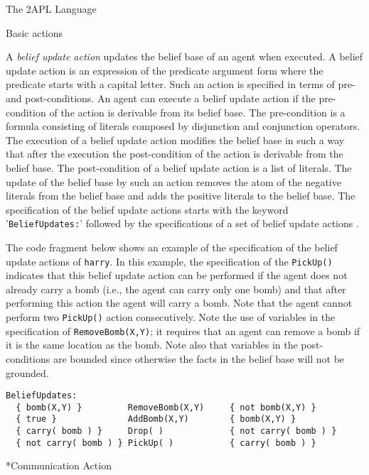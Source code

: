 \begin{chapter}{The 2APL Language}
\begin{section}{Basic actions}
\begin{subsection}
A {\em belief update action} updates the belief base of an agent
when executed. A belief update action  is an
expression of the predicate argument form where the predicate starts
with a capital letter. Such an action is specified in terms of pre-
and post-conditions. An agent can execute a belief update action if
the pre-condition of the action is derivable from its belief base.
The pre-condition is a formula consisting of literals composed by
disjunction and conjunction operators. The execution of a belief
update action modifies the belief base in such a way that after the
execution the post-condition of the action is derivable from the
belief base. The post-condition of a belief update action is a list
of literals. The update of the belief base by such an action removes
the atom of the negative literals from the belief base and adds the
positive literals to the belief base. The specification of the
belief update actions starts with the keyword '{\tt BeliefUpdates:}'
followed by the specifications of a set of belief update actions
.

The code fragment below shows an example of the specification of the
belief update actions of {\tt harry}. In this example, the
specification of the {\tt PickUp()} indicates that this belief
update action can be performed if the agent does not already carry a
bomb (i.e., the agent can carry only one bomb) and that after
performing this action the agent will carry a bomb.  Note that the
agent cannot perform two {\tt PickUp()} action consecutively. Note
the use of variables in the specification of {\tt RemoveBomb(X,Y)};
it requires that an agent can remove a bomb if it is the same
location as the bomb. Note also that variables in the
post-conditions are bounded since otherwise the facts in the belief
base will not be grounded.

\begin{verbatim}
BeliefUpdates:
  { bomb(X,Y) }         RemoveBomb(X,Y)     { not bomb(X,Y) }
  { true }              AddBomb(X,Y)        { bomb(X,Y) }
  { carry( bomb ) }     Drop( )             { not carry( bomb ) }
  { not carry( bomb ) } PickUp( )           { carry( bomb ) }
\end{verbatim}

\end{subsection}

\begin{subsection}*{Communication Action}


\end{subsection}
\end{section}
\end{chapter}
